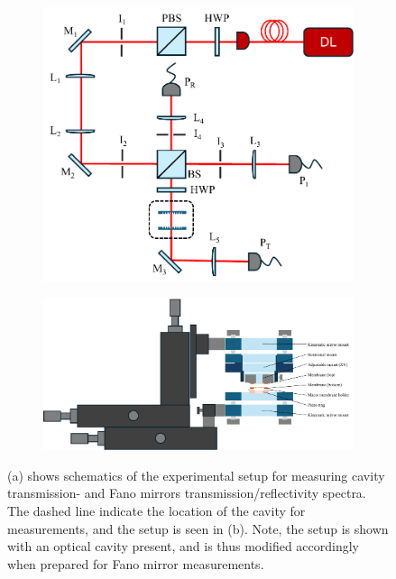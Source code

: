 \begin{figure}[h!]
    \centering
    \begin{subfigure}[b]{0.4\textwidth}
        \includegraphics[width=\textwidth]{figures/setup_sketch.pdf}
        \caption{}
        \label{fig:setup_sketch}
    \end{subfigure}
    \hfill
    \begin{subfigure}[b]{0.59\textwidth}
        \includegraphics[width=\textwidth]{figures/setup_skecth_zoomed.pdf}
        \caption{}
        \label{fig:setup_zoomed}
    \end{subfigure}
    \caption{(a) shows schematics of the experimental setup for measuring cavity transmission- and Fano mirrors transmission/reflectivity spectra. The dashed line indicate the location of the cavity for measurements, and the setup is seen in (b). Note, the setup is shown with an optical cavity present, and is thus modified accordingly when prepared for Fano mirror measurements.}
    \label{fig:experimental_setup}
\end{figure}

